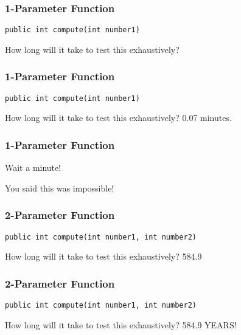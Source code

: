\begin{frame}
\frametitle{1-Parameter Function}
\begin{changemargin}{1cm}

\texttt{public int compute(int number1)}

How long will it take to test this exhaustively?

\end{changemargin}
\end{frame}

\begin{frame}
\frametitle{1-Parameter Function}
\begin{changemargin}{1cm}

\texttt{public int compute(int number1)}

How long will it take to test this exhaustively? \alert{0.07 minutes}.

\end{changemargin}
\end{frame}

\begin{frame}
\frametitle{1-Parameter Function}
\begin{changemargin}{1cm}

Wait a minute!

You said this was impossible!


\end{changemargin}
\end{frame}


\begin{frame}
\frametitle{2-Parameter Function}
\begin{changemargin}{1cm}

\texttt{public int compute(int number1, int number2)}

How long will it take to test this exhaustively? \alert{584.9}

\end{changemargin}
\end{frame}

\begin{frame}
\frametitle{2-Parameter Function}
\begin{changemargin}{1cm}

\texttt{public int compute(int number1, int number2)}

How long will it take to test this exhaustively? \alert{584.9 YEARS!}

\end{changemargin}
\end{frame}


